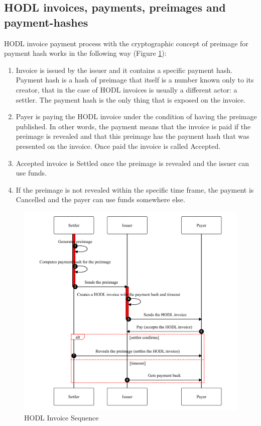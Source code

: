 \documentclass{article}
\begin{document}
\subsection{HODL invoices, payments, preimages and payment-hashes}
HODL invoice payment process with the cryptographic concept of preimage for payment hash works in the following way (Figure \ref{fig:lndsequence}):
\begin{enumerate}
	\item Invoice is issued by the issuer and it contains a specific payment hash. Payment hash is a hash of preimage that itself is a number known only to its creator, that in the case of HODL invoices is usually a different actor: a settler. The payment hash is the only thing that is exposed on the invoice.
	\item Payer is paying the HODL invoice under the condition of having the preimage published. In other words, the payment means that the invoice is paid if the preimage is revealed and that this preimage has the payment hash that was presented on the invoice. Once paid the invoice is called Accepted.
	\item Accepted invoice is Settled once the preimage is revealed and the issuer can use funds.
	\item If the preimage is not revealed within the specific time frame, the payment is Cancelled and the payer can use funds somewhere else.
\end{enumerate}


\begin{figure}
	\centering
	\includegraphics[scale=0.6]{LNDSequence.pdf}
	\caption{HODL Invoice Sequence}
	\label{fig:lndsequence}
\end{figure}
\end{document}
